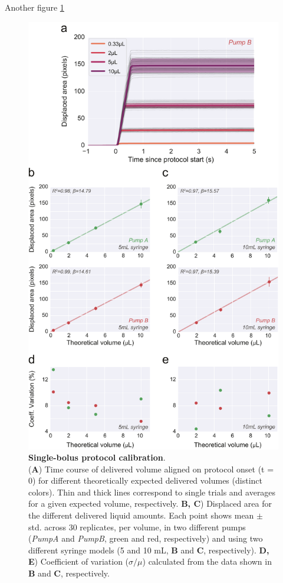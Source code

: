 Another figure \ref{fig:SingleStepCalibration}
\begin{figure}
	\centering
	\includegraphics[width=1.0\linewidth]{Figures/Artboard 5.pdf}
	\caption{\textbf{Single-bolus protocol calibration}.\\
		 (\textbf{A}) Time course of delivered volume aligned on protocol onset (t = 0) for different theoretically expected delivered volumes (distinct colors). Thin and thick lines correspond to single trials and averages for a given expected volume, respectively. \textbf{B, C}) Displaced area for the different delivered liquid amounts. Each point shows mean $\pm$ std. across 30 replicates, per volume, in two different pumps (\textit{PumpA} and \textit{PumpB}, green and red, respectively) and using two different syringe models (5 and 10 mL, \textbf{B} and \textbf{C}, respectively). \textbf{D, E}) Coefficient of variation ($\sigma / \mu$) calculated from the data shown in \textbf{B} and \textbf{C}, respectively.}
	\label{fig:SingleStepCalibration} 
\end{figure}


